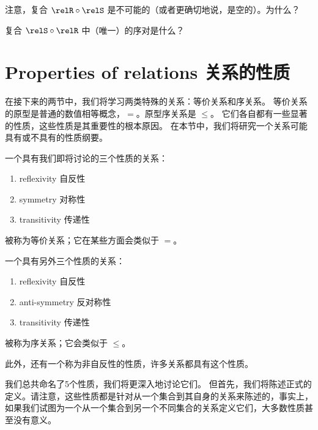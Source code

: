 \begin{exer}
注意，复合 $\relR \circ \relS$ 是不可能的（或者更确切地说，是空的）。为什么？

复合 $\relS \circ \relR$ 中（唯一）的序对是什么？
\end{exer}

\newpage





\newpage

\section{Properties of relations 关系的性质}
\label{sec:rel_props}

在接下来的两节中，我们将学习两类特殊的关系：等价关系和序关系。
等价关系的原型是普通的数值相等概念，$=$。原型序关系是 $\leq$。
它们各自都有一些显著的性质，这些性质是其重要性的根本原因。
在本节中，我们将研究一个关系可能具有或不具有的性质纲要。

一个具有我们即将讨论的三个性质的关系：

\begin{enumerate}
\item {} reflexivity 
\noindent  {} 自反性
\item {}symmetry 
\noindent  {}对称性
\item {}transitivity
\noindent  {}传递性
\end{enumerate}

\noindent 被称为等价关系；它在某些方面会类似于 $=$。

一个具有另外三个性质的关系：

\begin{enumerate}
\item {}reflexivity 
\noindent  {}自反性
\item {}anti-symmetry 
\noindent  {}反对称性
\item {}transitivity
\noindent  {}传递性
\end{enumerate}

\noindent 被称为序关系；它会类似于 $\leq$。

此外，还有一个称为非自反性的性质，许多关系都具有这个性质。

我们总共命名了5个性质，我们将更深入地讨论它们。
但首先，我们将陈述正式的定义。请注意，这些性质都是针对从一个集合到其自身的关系来陈述的，事实上，如果我们试图为一个从一个集合到另一个不同集合的关系定义它们，大多数性质甚至没有意义。

